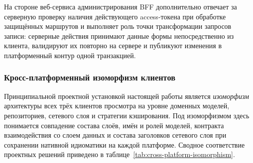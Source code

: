 На стороне веб-сервиса администрирования BFF дополнительно отвечает за серверную проверку наличия действующего access-токена при обработке защищённых маршрутов и выполняет роль точки трансформации запросов записи: серверные действия принимают данные формы непосредственно из клиента, валидируют их повторно на сервере и публикуют изменения в платформенный контур одной транзакцией.

\subsubsection{Кросс-платформенный изоморфизм клиентов}
\label{subsubsec:cross-platform-isomorphism}

Принципиальной проектной установкой настоящей работы является \emph{изоморфизм} архитектуры всех трёх клиентов просмотра на уровне доменных моделей, репозиториев, сетевого слоя и стратегии кэширования. Под изоморфизмом здесь понимается совпадение состава слоёв, имён и ролей моделей, контракта взаимодействия со слоем данных и состава заголовков сетевого слоя при сохранении нативной идиоматики на каждой платформе. Сводное соответствие проектных решений приведено в таблице~\ref{tab:cross-platform-isomorphism}.

